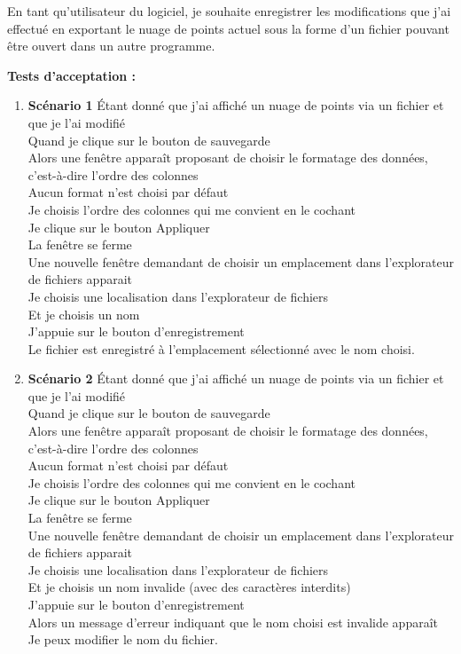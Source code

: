 \documentclass[12pt,titlepage,french]{article}
\begin{document}
\begin{enumerate}
En tant qu'utilisateur du logiciel, je souhaite enregistrer les modifications que j'ai effectué en exportant le nuage de points actuel sous la forme d'un fichier pouvant être ouvert dans un autre programme.

\textbf{Tests d'acceptation :}

\begin{enumerate}
    \item \textbf{Scénario 1}
Étant donné que j'ai affiché un nuage de points via un fichier et que je l'ai modifié\\
Quand je clique sur le bouton de sauvegarde\\
Alors une fenêtre apparaît proposant de choisir le formatage des données, c'est-à-dire l'ordre des colonnes\\
Aucun format n'est choisi par défaut\\
Je choisis l'ordre des colonnes qui me convient en le cochant\\
Je clique sur le bouton Appliquer\\
La fenêtre se ferme\\
Une nouvelle fenêtre demandant de choisir un emplacement dans l'explorateur de fichiers apparait\\
Je choisis une localisation dans l'explorateur de fichiers\\
Et je choisis un nom\\
J'appuie sur le bouton d'enregistrement\\
Le fichier est enregistré à l'emplacement sélectionné avec le nom choisi.

    \item \textbf{Scénario 2}
Étant donné que j'ai affiché un nuage de points via un fichier et que je l'ai modifié\\
Quand je clique sur le bouton de sauvegarde\\
Alors une fenêtre apparaît proposant de choisir le formatage des données, c'est-à-dire l'ordre des colonnes\\
Aucun format n'est choisi par défaut\\
Je choisis l'ordre des colonnes qui me convient en le cochant\\
Je clique sur le bouton Appliquer\\
La fenêtre se ferme\\
Une nouvelle fenêtre demandant de choisir un emplacement dans l'explorateur de fichiers apparait\\
Je choisis une localisation dans l'explorateur de fichiers\\
Et je choisis un nom invalide (avec des caractères interdits)\\
J'appuie sur le bouton d'enregistrement\\
Alors un message d'erreur indiquant que le nom choisi est invalide apparaît\\
Je peux modifier le nom du fichier.


\end{enumerate}
\end{enumerate}
\end{document}

